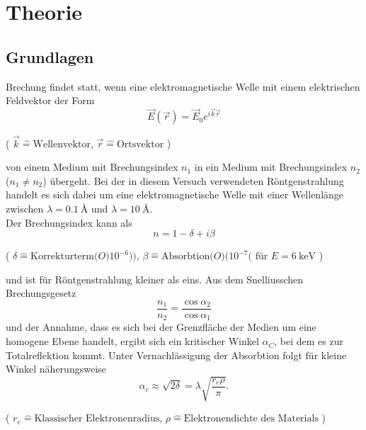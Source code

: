 \section{Theorie}
\subsection{Grundlagen} \label{chap:Grundlagen}
Brechung findet statt, wenn eine elektromagnetische Welle mit einem elektrischen Feldvektor der Form 
\begin{equation}
    \vec{E}(\vec{r}) = \vec{E}_0 e^{i \vec{k} \vec{r} } 
\end{equation}
\begin{center}
    \tiny{( $ \vec{k} \hat{=} \text{Wellenvektor} $, $ \vec{r} \hat{=} \text{Ortsvektor} $ )}
\end{center}
von einem Medium mit Brechungsindex $n_1$ in ein Medium mit Brechungsindex $n_2$ ($n_1 \neq n_2$) übergeht. 
Bei der in diesem Versuch verwendeten Röntgenstrahlung handelt es sich dabei um eine elektromagnetische Welle mit einer Wellenlänge zwischen $\lambda = \SI{0,1}{\angstrom}$ und $\lambda = \SI{10}{\angstrom}$. \\
Der Brechungsindex kann als 
\begin{equation}
    n = 1 - \delta + i\beta
\end{equation}
\begin{center}
    \tiny{( $ \delta \hat{=} \text{Korrekturterm}\mathcal(O)10^{-6})) $, $ \beta \hat{=} \text{Absorbtion}\mathcal(O)(10^{-7} (\text{ für } E = \SI{6}{\kilo \electronvolt}   $ )}
\end{center}
und ist für Röntgenstrahlung kleiner als eins.
Aus dem Snelliusschen Brechungsgesetz 
\begin{equation}
    \frac{n_1}{n_2} = \frac{\cos{\alpha_2}}{\cos{\alpha_1}}
\end{equation}
und der Annahme, dass es sich bei der Grenzfläche der Medien um eine homogene Ebene handelt, ergibt sich ein kritischer Winkel $\alpha_C$, bei dem es zur Totalreflektion kommt. Unter Vernachlässigung der Absorbtion folgt für kleine Winkel näherungsweise
\begin{equation}
    \alpha_c \approx \sqrt{2 \delta} = \lambda \sqrt{ \frac{r_e \rho}{\pi} } .
\end{equation}
\begin{center}
    \tiny{( $ r_e \hat{=} \text{Klassischer Elektronenradius} $, $ \rho \hat{=} \text{Elektronendichte des Materials}$ )}
\end{center}

